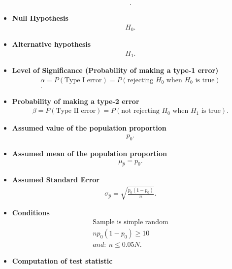 \documentclass{report}
\begin{document}
\begin{itemize}
\begin{align*}
            .\end{align*}
        \item \textbf{Null Hypothesis} 
            \begin{align*}
                H_{0}
            .\end{align*}
        \item \textbf{Alternative hypothesis} 
            \begin{align*}
                H_{1}
            .\end{align*}
        \item \textbf{Level of Significance (Probability of making a type-1 error)} 
            \begin{align*}
                \alpha = P(\text{Type I error}) = P(\text{rejecting } H_0 \text{ when } H_0 \text{ is true}) \\
            .\end{align*}
        \item \textbf{Probability of making a type-2 error}
            \begin{align*}
                \beta = P(\text{Type II error}) = P(\text{not rejecting } H_0 \text{ when } H_1 \text{ is true})
            .\end{align*}
        \item \textbf{Assumed value of the population proportion}
            \begin{align*}
                p_{0}
            .\end{align*}
        \item \textbf{Assumed mean of the population proportion} 
          \begin{align*}
            \mu_{\hat{p}} = p_{0}
          .\end{align*}
        \item \textbf{Assumed Standard Error}
            \begin{align*}
                \sigma_{\hat{p}} =\sqrt{\frac{p_{0}(1-p_{0})}{n}}
            .\end{align*}
        \item \textbf{Conditions}
            \begin{align*}
                \text{Sample is simple random} \\
                np_{0}(1-p_{0}) \geq 10 \\
                and:\ n \leq 0.05N
            .\end{align*}
        \item \textbf{Computation of test statistic}

\end{itemize}
\end{document}
